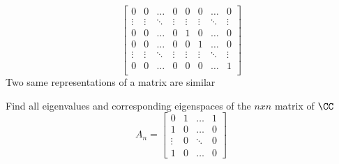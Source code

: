 \documentclass[11pt]{scrartcl}
\begin{document}
\begin{soln}
\begin{enumerate}
		\[
		\begin{bmatrix}
			0 & 0 & \dots & 0 & 0 & 0 & \dots & 0\\
			\vdots & \vdots & \ddots & \vdots & \vdots & \vdots & \ddots & \vdots\\
			0 & 0 & \dots & 0 & 1 & 0 & \dots & 0\\
			0 & 0 & \dots & 0 & 0 & 1 & \dots & 0\\
			\vdots & \vdots & \ddots & \vdots & \vdots & \vdots & \ddots & \vdots\\
			0 & 0 & \dots & 0 & 0 & 0 & \dots & 1\\
		\end{bmatrix}
		\]
		Two same representations of a matrix are similar
	\end{enumerate} 
\end{soln}

\begin{example}
	Find all eigenvalues and corresponding eigenspaces of the $nxn$ matrix of $\CC$
	\[
	A_n =
	\begin{bmatrix}
		0 & 1 & \dots & 1\\
		1 & 0 & \dots & 0\\
		\vdots & 0 & \ddots & 0\\
		1 & 0 & \dots & 0
	\end{bmatrix}
	\]
\end{example}
\end{document}
